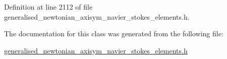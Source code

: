 Definition at line 2112 of file generalised\+\_\+newtonian\+\_\+axisym\+\_\+navier\+\_\+stokes\+\_\+elements.\+h.



The documentation for this class was generated from the following file\+:\begin{DoxyCompactItemize}
\item 
\hyperlink{generalised__newtonian__axisym__navier__stokes__elements_8h}{generalised\+\_\+newtonian\+\_\+axisym\+\_\+navier\+\_\+stokes\+\_\+elements.\+h}\end{DoxyCompactItemize}

